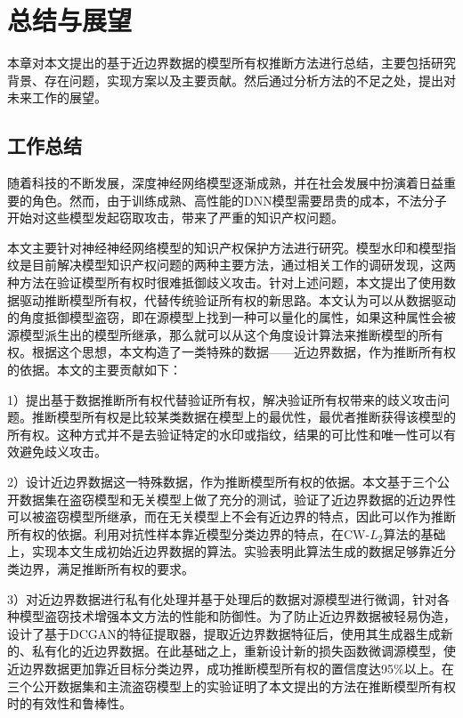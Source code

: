 \chapter{总结与展望}\label{6}

本章对本文提出的基于近边界数据的模型所有权推断方法进行总结，主要包括研究背景、存在问题，实现方案以及主要贡献。然后通过分析方法的不足之处，提出对未来工作的展望。

\section{工作总结}

随着科技的不断发展，深度神经网络模型逐渐成熟，并在社会发展中扮演着日益重要的角色。然而，由于训练成熟、高性能的DNN模型需要昂贵的成本，不法分子开始对这些模型发起窃取攻击，带来了严重的知识产权问题。

本文主要针对神经神经网络模型的知识产权保护方法进行研究。模型水印和模型指纹是目前解决模型知识产权问题的两种主要方法，通过相关工作的调研发现，这两种方法在验证模型所有权时很难抵御歧义攻击。针对上述问题，本文提出了使用数据驱动推断模型所有权，代替传统验证所有权的新思路。本文认为可以从数据驱动的角度抵御模型盗窃，即在源模型上找到一种可以量化的属性，如果这种属性会被源模型派生出的模型所继承，那么就可以从这个角度设计算法来推断模型的所有权。根据这个思想，本文构造了一类特殊的数据——近边界数据，作为推断所有权的依据。本文的主要贡献如下：

1）提出基于数据推断所有权代替验证所有权，解决验证所有权带来的歧义攻击问题。推断模型所有权是比较某类数据在模型上的最优性，最优者推断获得该模型的所有权。这种方式并不是去验证特定的水印或指纹，结果的可比性和唯一性可以有效避免歧义攻击。

2）设计近边界数据这一特殊数据，作为推断模型所有权的依据。本文基于三个公开数据集在盗窃模型和无关模型上做了充分的测试，验证了近边界数据的近边界性可以被盗窃模型所继承，而在无关模型上不会有近边界的特点，因此可以作为推断所有权的依据。利用对抗性样本靠近模型分类边界的特点，在CW-$L_2$算法的基础上，实现本文生成初始近边界数据的算法。实验表明此算法生成的数据足够靠近分类边界，满足推断所有权的要求。

3）对近边界数据进行私有化处理并基于处理后的数据对源模型进行微调，针对各种模型盗窃技术增强本文方法的性能和防御性。为了防止近边界数据被轻易伪造，设计了基于DCGAN的特征提取器，提取近边界数据特征后，使用其生成器生成新的、私有化的近边界数据。在此基础之上，重新设计新的损失函数微调源模型，使近边界数据更加靠近目标分类边界，成功推断模型所有权的置信度达95\%以上。在三个公开数据集和主流盗窃模型上的实验证明了本文提出的方法在推断模型所有权时的有效性和鲁棒性。



